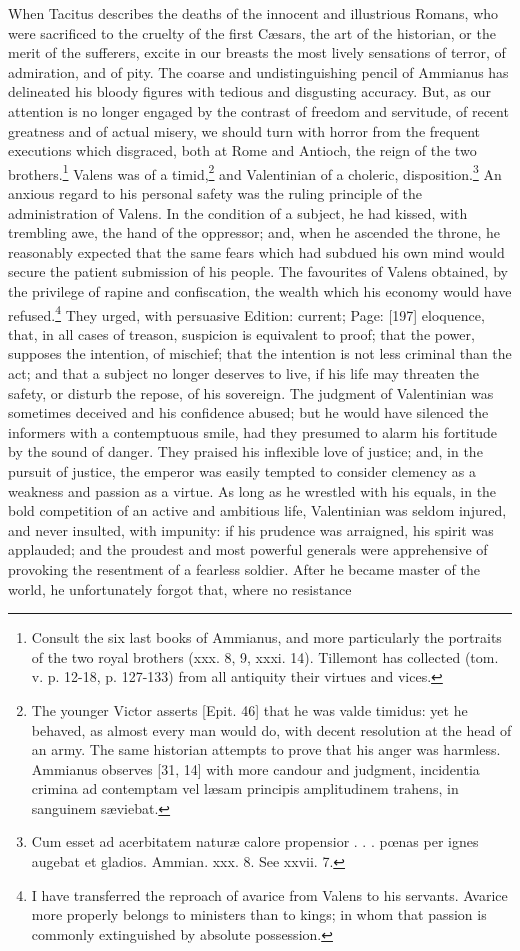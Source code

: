 When Tacitus describes the deaths of the innocent and illustrious Romans, who were sacrificed to the cruelty of the first Cæsars, the art of the historian, or the merit of the sufferers, excite in our breasts the most lively sensations of terror, of admiration, and of pity. The coarse and undistinguishing pencil of Ammianus has delineated his bloody figures with tedious and disgusting accuracy. But, as our attention is no longer engaged by the contrast of freedom and servitude, of recent greatness and of actual misery, we should turn with horror from the frequent executions which disgraced, both at Rome and Antioch, the reign of the two brothers.\footnote{Consult the six last books of Ammianus, and more particularly the portraits of the two royal brothers (xxx. 8, 9, xxxi. 14). Tillemont has collected (tom. v. p. 12-18, p. 127-133) from all antiquity their virtues and vices.} Valens was of a timid,\footnote{The younger Victor asserts [Epit. 46] that he was valde timidus: yet he behaved, as almost every man would do, with decent resolution at the head of an army. The same historian attempts to prove that his anger was harmless. Ammianus observes [31, 14] with more candour and judgment, incidentia crimina ad contemptam vel læsam principis amplitudinem trahens, in sanguinem sæviebat.} and Valentinian of a choleric, disposition.\footnote{Cum esset ad acerbitatem naturæ calore propensior . . . pœnas per ignes augebat et gladios. Ammian. xxx. 8. See xxvii. 7.} An anxious regard to his personal safety was the ruling principle of the administration of Valens. In the condition of a subject, he had kissed, with trembling awe, the hand of the oppressor; and, when he ascended the throne, he reasonably expected that the same fears which had subdued his own mind would secure the patient submission of his people. The favourites of Valens obtained, by the privilege of rapine and confiscation, the wealth which his economy would have refused.\footnote{I have transferred the reproach of avarice from Valens to his servants. Avarice more properly belongs to ministers than to kings; in whom that passion is commonly extinguished by absolute possession.} They urged, with persuasive Edition: current; Page: [197] eloquence, that, in all cases of treason, suspicion is equivalent to proof; that the power, supposes the intention, of mischief; that the intention is not less criminal than the act; and that a subject no longer deserves to live, if his life may threaten the safety, or disturb the repose, of his sovereign. The judgment of Valentinian was sometimes deceived and his confidence abused; but he would have silenced the informers with a contemptuous smile, had they presumed to alarm his fortitude by the sound of danger. They praised his inflexible love of justice; and, in the pursuit of justice, the emperor was easily tempted to consider clemency as a weakness and passion as a virtue. As long as he wrestled with his equals, in the bold competition of an active and ambitious life, Valentinian was seldom injured, and never insulted, with impunity: if his prudence was arraigned, his spirit was applauded; and the proudest and most powerful generals were apprehensive of provoking the resentment of a fearless soldier. After he became master of the world, he unfortunately forgot that, where no resistance 